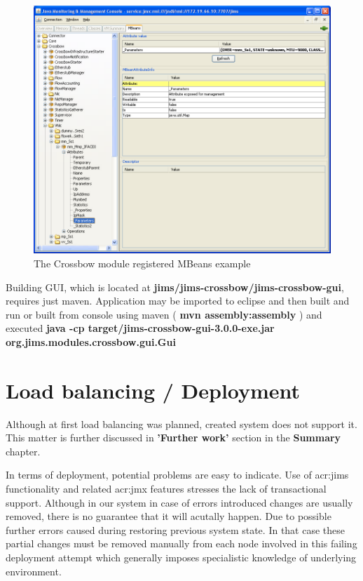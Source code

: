 \documentclass[11pt]{book}
\begin{document}
	  \begin{figure}[H]
        \begin{center}
            \includegraphics[width=1.0\textwidth]{img/impl/jconsole.png}
        \end{center}
        \caption{The Crossbow module registered MBeans example}
      \end{figure}
	  
	  Building GUI, which is located at \textbf{jims/jims-crossbow/jims-crossbow-gui}, requires just maven. Application may 
	  be imported to eclipse and then built and run or built from console using maven (\textbf{ mvn assembly:assembly })
	  and executed \textbf{java -cp target/jims-crossbow-gui-3.0.0-exe.jar org.jims.modules.crossbow.gui.Gui}


    \section{Load balancing / Deployment}
    \label{sec:impl:problems}
	  
		Although at first load balancing was planned, created system does not support it. This matter is further 
		discussed in \textbf{'Further work'} section in the \textbf{Summary} chapter.
		
		In terms of deployment, potential problems are easy to indicate. Use of \gls{acr:jims} functionality and related \gls{acr:jmx} 
		features stresses the lack of transactional support. Although in our system in case of errors introduced changes
		are usually removed, there is no guarantee that it will acutally happen. Due to possible further errors caused during 
		restoring previous system state. In that case these partial changes must be removed manually from each node
		involved in this failing deployment attempt which generally imposes specialistic knowledge of underlying environment. 
\end{document}
